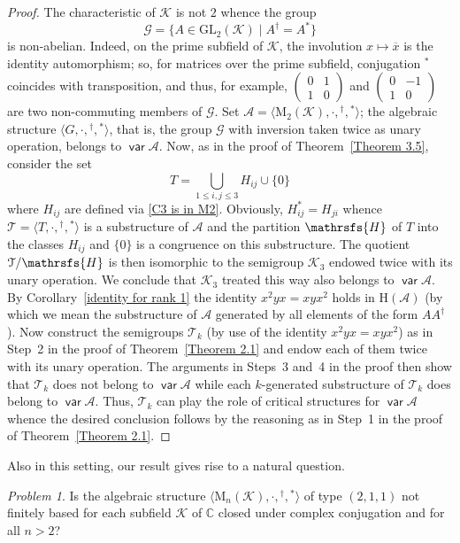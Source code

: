 \documentclass[11pt,reqno]{amsart}
\DeclareMathOperator{\var}{\mathsf{var}}
\numberwithin{equation}{section}
\def\bb{\mathbb}
\theoremstyle{remark}
\newtheorem{Problem}{Problem}[section]
\def\cal{\mathcal}
\def\Ac{{\cal A}}
\def\Hc{\mathrsfs{H}}
\def\Tc{{\cal T}}
\def\ol{\overline}
\def\H{\mathrm H}
\begin{document}
\begin{proof}
The characteristic of $\mathcal{K}$ is not $2$ whence the group
$$\mathcal{G}=\{A\in \textrm{GL}_2(\mathcal{K})\mid A^\dag=A^*\}$$
is non-abelian. Indeed, on the prime subfield of $\mathcal{K}$,
the involution $x \mapsto \ol x$ is the identity automorphism; so,
for matrices over the prime subfield, conjugation ${}^*$ coincides
with transposition,
and thus, for example, $(\begin{smallmatrix} 0 & 1\\
1 & 0\end{smallmatrix})$ and $(\begin{smallmatrix} 0 & -1\\ 1 & 0
\end{smallmatrix})$ are two non-commuting members of $\mathcal{G}$. Set
$\Ac=\langle\mathrm{M}_2(\mathcal{K}),\cdot,{}^\dag,{}^*\rangle$;
the algebraic structure $\langle G,\cdot,{}^\dag,{}^*\rangle$,
that is, the group $\mathcal{G}$ with inversion taken twice as
unary operation, belongs to $\var\Ac$. Now, as in the proof of
Theorem~\ref{Theorem 3.5}, consider the set
$$T=\bigcup_{1\le i,j\le3}H_{ij}\cup\{0\}$$
where $H_{ij}$ are defined via \eqref{C3 is in M2}. Obviously,
$H_{ij}^*=H_{ji}$ whence $\Tc=\langle T,\cdot,{}^\dag,{}^*\rangle$
is a substructure of $\Ac$ and the partition $\Hc$ of $T$ into the
classes $H_{ij}$ and $\{0\}$ is a congruence on this substructure.
The quotient $\Tc/\Hc$ is then isomorphic to the semigroup
$\mathcal{K}_3$ endowed twice with its unary operation. We
conclude that  $\mathcal{K}_3$ treated this way also belongs to
$\var\Ac$. By Corollary~\ref{identity for rank 1} the identity
$x^2yx=xyx^2$ holds in $\H(\Ac)$ (by which we mean the
substructure of $\Ac$ generated by all elements of the form
$AA^\dag$). Now construct the semigroups $\Tc_k$ (by use of the
identity $x^2yx=xyx^2$) as in Step~2 in the proof of
Theorem~\ref{Theorem 2.1} and endow each of them twice with its
unary operation. The arguments in Steps~3 and~4 in the proof then
show that $\Tc_k$ does not belong to $\var \Ac$ while each
$k$-generated substructure of $\Tc_k$ does belong to $\var\Ac$.
Thus, $\Tc_k$ can play the role of critical structures for
$\var\Ac$ whence the desired conclusion follows by the reasoning
as in Step~1 in the proof of Theorem~\ref{Theorem 2.1}.
\end{proof}

Also in this setting, our result gives rise to a natural question.
\begin{Problem}
\label{problem on Moore-Penrose + conjugation} Is the algebraic
structure
$\langle\mathrm{M}_n(\mathcal{K}),\cdot,{}^\dag,{}^*\rangle$ of
type $(2,1,1)$ not finitely based for each subfield $\mathcal{K}$
of $\bb C$ closed under complex conjugation and for all $n>2$?
\end{Problem}
\end{document}
